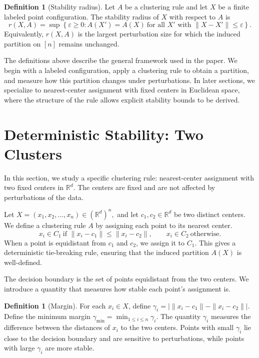 \documentclass[11pt]{amsart}
\theoremstyle{plain}
\theoremstyle{definition}
\newtheorem{definition}[subsection]{Definition}
\begin{document}
\begin{definition}[Stability radius]
Let $A$ be a clustering rule and let $X$ be a finite labeled point configuration. The stability radius of $X$ with respect to $A$ is
\[
r(X,A) = \sup \left\{ \varepsilon \ge 0 : A(X') = A(X)\ \text{for all } X' \text{ with } \|X - X'\| \le \varepsilon \right\}.
\]
Equivalently, $r(X,A)$ is the largest perturbation size for which the induced partition on $[n]$ remains unchanged.
\end{definition}

The definitions above describe the general framework used in the paper. We begin with a labeled configuration, apply a clustering rule to obtain a partition, and measure how this partition changes under perturbations. In later sections, we specialize to nearest-center assignment with fixed centers in Euclidean space, where the structure of the rule allows explicit stability bounds to be derived.



\section{Deterministic Stability: Two Clusters}

In this section, we study a specific clustering rule: nearest-center assignment with two fixed centers in $\mathbb{R}^d$. The centers are fixed and are not affected by perturbations of the data.

Let
$X = (x_1, x_2, \ldots, x_n) \in (\mathbb{R}^d)^n,$
and let $c_1, c_2 \in \mathbb{R}^d$ be two distinct centers. We define a clustering rule $A$ by assigning each point to its nearest center.
\[
x_i \in C_1 \ \text{if } \|x_i - c_1\| \le \|x_i - c_2\|, \qquad
x_i \in C_2 \ \text{otherwise}.
\]
When a point is equidistant from $c_1$ and $c_2$, we assign it to $C_1$. This gives a deterministic tie-breaking rule, ensuring that the induced partition $A(X)$ is well-defined.

The decision boundary is the set of points equidistant from the two centers. We introduce a quantity that measures how stable each point’s assignment is.

\begin{definition}[Margin]
For each $x_i \in X$, define
$\gamma_i = \left| \|x_i - c_1\| - \|x_i - c_2\| \right|.$
Define the minimum margin
$\gamma_{\min} = \min_{1 \le i \le n} \gamma_i.$ The quantity $\gamma_i$ measures the difference between the distances of $x_i$ to the two centers. Points with small $\gamma_i$ lie close to the decision boundary and are sensitive to perturbations, while points with large $\gamma_i$ are more stable.
\end{definition}
\end{document}

